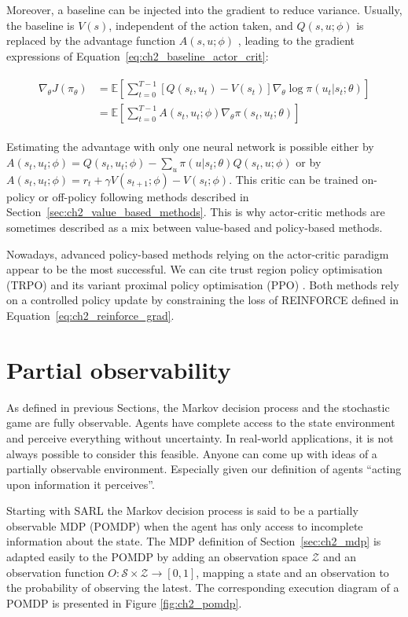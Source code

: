 Moreover, a baseline can be injected into the gradient to reduce variance.
Usually, the baseline is  $V(s)$, independent of the action taken, and $Q(s, u;\phi)$ is replaced by the advantage function $A(s,u; \phi)$ \citep{10.5555/2074022.2074088}, leading to the gradient expressions of Equation~\ref{eq:ch2_baseline_actor_crit}:

\begin{align}
\begin{split}
\label{eq:ch2_baseline_actor_crit}
    \nabla_\theta J(\pi_\theta)
    & = \mathbb{E}\left[\sum_{t=0}^{T-1} [Q(s_t, u_t) - V(s_t)] \nabla_\theta \log \pi(u_t|s_t;\theta)\right]\\
    & = \mathbb{E} \left[\sum_{t=0}^{T-1} A(s_t, u_t; \phi) \nabla_\theta \pi(s_t, u_t; \theta)\right]
\end{split}
\end{align}

Estimating the advantage with only one neural network is possible either by $A(s_t,u_t; \phi)=Q(s_t, u_t;\phi)-\sum_u \pi(u|s_t;\theta) Q(s_t,u; \phi)$ or by $A(s_t,u_t; \phi)=r_t +\gamma V(s_{t+1};\phi) - V(s_t;\phi)$.
This critic can be trained on-policy or off-policy following methods described in Section~\ref{sec:ch2_value_based_methods}.
This is why actor-critic methods are sometimes described as a mix between value-based and policy-based methods.

Nowadays, advanced policy-based methods relying on the actor-critic paradigm appear to be the most successful.
We can cite trust region policy optimisation (TRPO) \citep{schulman2015trust} and its variant proximal policy optimisation (PPO) \citep{schulman2017ppo}.
Both methods rely on a controlled policy update by constraining the loss of REINFORCE defined in Equation~\ref{eq:ch2_reinforce_grad}.

\section{Partial observability} \label{sec:ch2_partial_observability}
As defined in previous Sections, the Markov decision process and the stochastic game are fully observable.
Agents have complete access to the state environment and perceive everything without uncertainty.
In real-world applications, it is not always possible to consider this feasible.
Anyone can come up with ideas of a partially observable environment.
Especially given our definition of agents ``acting upon information it perceives''.

Starting with SARL the Markov decision process is said to be a partially observable MDP (POMDP) \citep{KAELBLING199899} when the agent has only access to incomplete information about the state.
The MDP definition of Section~\ref{sec:ch2_mdp} is adapted easily to the POMDP by adding an observation space $\mathcal{Z}$ and an observation function $O:\mathcal{S} \times \mathcal{Z} \rightarrow [0, 1]$, mapping a state and an observation to the probability of observing the latest.
The corresponding execution diagram of a POMDP is presented in Figure \ref{fig:ch2_pomdp}.


